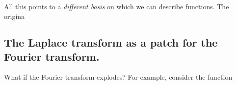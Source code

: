 \documentclass[letterpaper,12pt]{report}
\begin{document}
All this points to a \emph{different basis} on which we can describe functions.
The origina







\subsection{The Laplace transform as a patch for the Fourier transform.}

What if the Fourier transform explodes?
For example, consider the function





\end{document}
